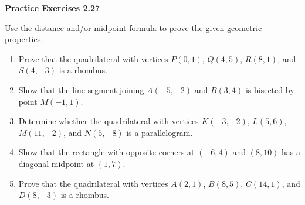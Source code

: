 \vspace{0.3ex}
\noindent\textbf{Practice Exercises 2.27}

\vspace{0.2ex}

Use the distance and/or midpoint formula to prove the given geometric properties.

\begin{enumerate}
    \item Prove that the quadrilateral with vertices $P(0,1)$, $Q(4,5)$, $R(8,1)$, and $S(4,-3)$ is a rhombus.
    \item Show that the line segment joining $A(-5,-2)$ and $B(3,4)$ is bisected by point $M(-1,1)$.
    \item Determine whether the quadrilateral with vertices $K(-3,-2)$, $L(5,6)$, $M(11,-2)$, and $N(5,-8)$ is a parallelogram.
    \item Show that the rectangle with opposite corners at $(-6,4)$ and $(8,10)$ has a diagonal midpoint at $(1,7)$.
    \item Prove that the quadrilateral with vertices $A(2,1)$, $B(8,5)$, $C(14,1)$, and $D(8,-3)$ is a rhombus.
\end{enumerate}
